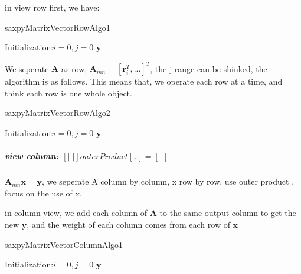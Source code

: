 \documentclass[UTF8]{../../09-Mathematics}
\begin{document}
in view row first, we have:

\begin{algorithm}[H]
    \caption{saxpyMatrixVectorRowAlgo1}\label{algo:saxpyMatrixVectorRowAlgo1}
    \SetAlgoLined
    Initialization:$i=0,j=0$\;
    \KwRet $\boldsymbol y$\;
\end{algorithm}


We seperate $  \boldsymbol A $ as row, $  \boldsymbol A_{mn} = [\boldsymbol r_{i}^T,...] ^T$, the j range can be shinked, the algorithm is as follows. This means that, we operate each row at a time, and think each row is one whole object.

\begin{algorithm}[H]
    \caption{saxpyMatrixVectorRowAlgo2}\label{algo:saxpyMatrixVectorRowAlgo2}
    \SetAlgoLined
    Initialization:$i=0,j=0$\;
    \KwRet $\boldsymbol y$\;
\end{algorithm}




\subparagraph{view column: $ [|||]  outerProduct [\overline{\ \ } ] =  [ \ \ ]$}



$\boldsymbol A_{mn} \boldsymbol x = \boldsymbol y $, we seperate A column by column, x row by row, use outer product , focus on the use of x.


in column view, we add each column of $\boldsymbol A$ to the same output column to get the new $\boldsymbol y$, and the weight of each column comes from each row of  $\boldsymbol x$

\begin{algorithm}[H]
    \caption{saxpyMatrixVectorColumnAlgo1}\label{algo:saxpyMatrixVectorColumnAlgo1}
    \SetAlgoLined
    Initialization:$i=0,j=0$\;
    \KwRet $\boldsymbol y$\;
\end{algorithm}
\end{document}
